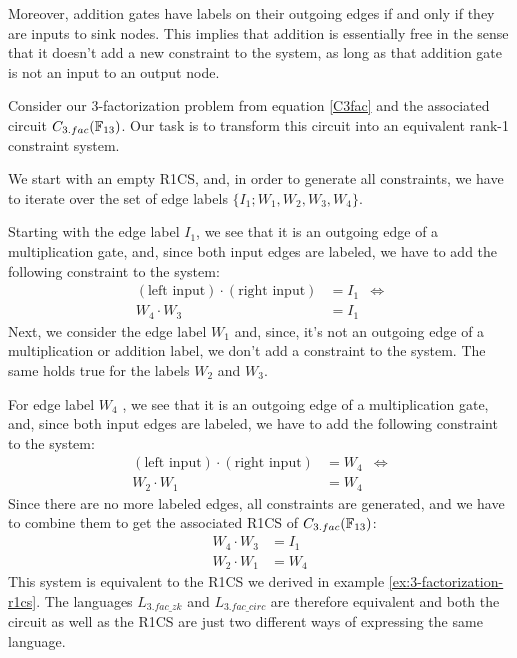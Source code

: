 Moreover, addition gates have labels on their outgoing edges if and only if they are inputs to sink nodes. This implies that addition is essentially free in the sense that it doesn't add a new constraint to the system, as long as that addition gate is not an input to an output node. 
\begin{example}[$3$-factorization] Consider our $3$-factorization problem from equation \ref{C3fac} and the associated circuit $C_{3.fac}(\mathbb{F}_{13})$. Our task is to transform this circuit into an equivalent rank-1 constraint system.
\begin{center}
\end{center}
We start with an empty R1CS, and, in order to generate all constraints, we have to iterate over the set of edge labels $\{I_1;W_1,W_2,W_3,W_4\}$. 

Starting with the edge label $I_1$, we see that it is an outgoing edge of a multiplication gate, and, since both input edges are labeled, we  have to add the following constraint to the system:
\begin{align*}
(\text{left input})\cdot (\text{right input})  &= I_1 & \Leftrightarrow\\
W_4\cdot W_3  &= I_1
\end{align*}
Next, we consider the edge label $W_1$ and, since, it's not an outgoing edge of a multiplication or addition label, we don't add a constraint to the system. The same holds true for the labels $W_2$ and $W_3$. 

For edge label $W_4$ , we see that it is an outgoing edge of a multiplication gate, and, since both input edges are labeled, we have to add the following constraint to the system:
\begin{align*}
(\text{left input})\cdot (\text{right input})  &= W_4 & \Leftrightarrow\\
W_2\cdot W_1  &= W_4
\end{align*} 
Since there are no more labeled edges, all constraints are generated, and we have to combine them to get the associated R1CS of $C_{3.fac}(\mathbb{F}_{13})$: 
\begin{align*}
 W_4\cdot W_3 & = I_1\\
 W_2\cdot W_1 & = W_4
\end{align*}
This system is equivalent to the R1CS we derived in example \ref{ex:3-factorization-r1cs}. The languages $L_{3.fac\_zk}$ and $L_{3.fac\_circ}$ are therefore equivalent and both the circuit as well as the R1CS are just two different ways of expressing the same language.
\end{example}
